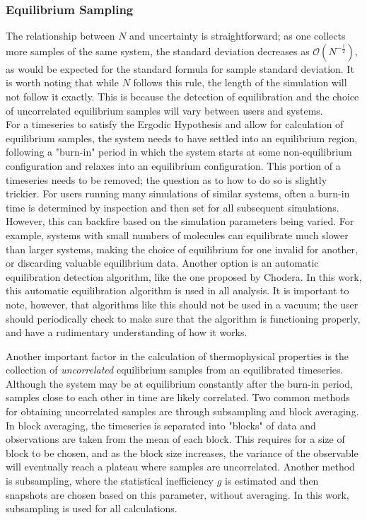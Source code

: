 \documentclass[aps,pre,twocolumn,nofootinbib,superscriptaddress,linenumbers,10pt, draft,tightenlines]{revtex4-1}
\begin{document}
\subsubsection{Equilibrium Sampling}
The relationship between $N$ and uncertainty is straightforward; as one collects more samples of the same system, the standard deviation decreases as $\mathcal{O} (N^{-\frac{1}{2}})$, as would be expected for the standard formula for sample standard deviation.  It is worth noting that while $N$ follows this rule, the length of the simulation will not follow it exactly.  This is because the detection of equilibration and the choice of uncorrelated equilibrium samples will vary between users and systems.  
\\
For a timeseries to satisfy the Ergodic Hypothesis and allow for calculation of equilibrium samples, the system needs to have settled into an equilibrium region, following a "burn-in" period in which the system starts at some non-equilibrium configuration and relaxes into an equilibrium configuration.  This portion of a timeseries needs to be removed; the question as to how to do so is slightly trickier.  For users running many simulations of similar systems, often a burn-in time is determined by inspection and then set for all subsequent simulations. However, this can backfire based on the simulation parameters being varied.  For example, systems with small numbers of molecules can equilibrate much slower than larger systems, making the choice of equilibrium for one invalid for another, or discarding valuable equilibrium data.  Another option is an automatic equilibration detection algorithm, like the one proposed by Chodera. %
In this work, this automatic equilibration algorithm is used in all analysis.  It is important to note, however, that algorithms like this should not be used in a vacuum;  the user should periodically check to make sure that the algorithm is functioning properly, and have a rudimentary understanding of how it works.

Another important factor in the calculation of thermophysical properties is the collection of \emph{uncorrelated} equilibrium samples from an equilibrated timeseries.  Although the system may be at equilibrium constantly after the burn-in period, samples close to each other in time are likely correlated.  Two common methods for obtaining uncorrelated samples are through subsampling and block averaging.  In block averaging, the timeseries is separated into "blocks" of data and observations are taken from the mean of each block.  This requires for a size of block to be chosen, and as the block size increases, the variance of the observable will eventually reach a plateau where samples are uncorrelated.  Another method is subsampling, where the statistical inefficiency $g$ is estimated and then snapshots are chosen based on this parameter, without averaging.  In this work, subsampling is used for all calculations.
\end{document}
